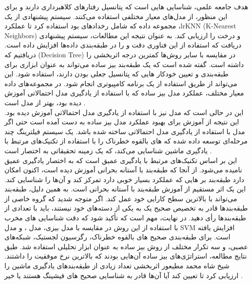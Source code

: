 \documentclass{CSICC2020}
\begin{document}
	هدف جامعه علمی، شناسایی هایی است که پتانسیل رفتارهای کلاهبرداری دارند و برای این منظور، از مدل‌های معیار مختلفی استفاده می‌کنند. سیستم پیشنهادی از یک مجموعه داده که شامل رخدادهای  بود استفاده کرد تا عملکرد  ،lr{KNN (K-Nearest Neighbors)} و درخت  را ارزیابی کند. به عنوان نتیجه این مطالعات، سیستم پیشنهادی دریافت که استفاده از این فناوری دقت  و  را در طبقه‌بندی داده‌ها افزایش داده است.  دریافتیم که \lr(Decision Tree) در مقایسه با سایر روش‌ها کمترین درجه اثربخشی را داشته است. گفته شده است که یک طبقه‌بند بیز ساده می‌تواند به عنوان ابزاری برای طبقه‌بندی و تعیین خودکار هایی که پتانسیل جعلی بودن دارند، استفاده شود. این می‌تواند از طریق استفاده از یک برنامه کامپیوتری انجام شود. در مجموعه‌های داده معیار مختلف، عملکرد مدل بیز ساده که با استفاده از یادگیری مدل احتمالاتی آموزش دیده بود، بهتر از مدل  است \cite{serda2013synteza}.\\
	این در حالی است که مدل  نیز با استفاده از یادگیری مدل احتمالاتی آموزش دیده بود. این نتیجه از آموزش برای بهبود عملکرد مدل بیز ساده به دست آمده است حتی اگر مدل  با استفاده از یادگیری مدل احتمالاتی ساخته شده باشد. یک سیستم فیلترینگ چند مرحله‌ای توسعه داده شده که های بالقوه خطرناک را با استفاده از تکنیک‌های مرتبط با یادگیری ماشین شناسایی می‌کند، که یک زمینه تحقیقاتی به اختصار  است \cite{serda2013synteza}.\\
	این بر اساس تکنیک‌های مرتبط با یادگیری عمیق است که به اختصار یادگیری عمیق نامیده می‌شود. از آنجا که طبقه‌بند با آستانه بحرانی آموزش دیده است، اکنون امکان دارد طبقه‌بند بر هایی که عملکرد بسیار خوبی دارد تمرکز کند و آن‌ها را شناسایی کند. این یک اثر مستقیم از آموزش طبقه‌بند با آستانه بحرانی است. به همین دلیل، طبقه‌بند می‌تواند با بالاترین سطح کارایی خود عمل کند. اگر متوجه شدید که گروه خاصی از طبقه‌بندها قادر به تخصیص صحیح یک  به یکی از دسته‌های خود نیستند، باید با تعدادی از طبقه‌بندها رأی دهید. در نهایت، مهم است که تأکید شود که دقت شناسایی های مخرب با استفاده از این روش در مقایسه با مدل بیزی، مدل ، و مدل SVM افزایش یافته است. برای طبقه‌بندی صحیح های بالقوه خطرناک، رگرسیون لجستیک، شبکه‌های عصبی، و سه تکرار مختلف از روش بیز ساده به عنوان ابزار تحلیلی استفاده شد. طبق نتایج مطالعه، استراتژی‌های بیز ساده آن‌هایی بودند که بالاترین نرخ موفقیت را داشتند. شیخ شاه محمد مطیعور اثربخشی تعداد زیادی از طبقه‌بندهای یادگیری ماشین را ارزیابی کرد تا تعیین کند آیا آن‌ها قادر به شناسایی صحیح های فیشینگ هستند یا خیر \cite{wu2022classification}.\\
\end{document}

